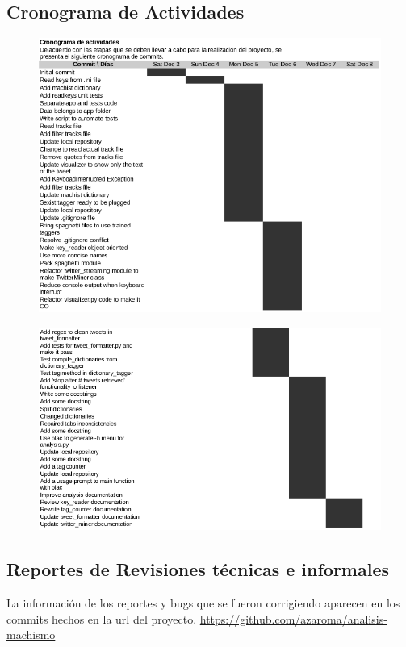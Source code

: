 \documentclass[oneside]{book}
\begin{document}
\subsection{Cronograma de Actividades}
\begin{figure}[H]
\includegraphics[scale=0.5]{crono1.png}
\end{figure}
\begin{figure}[H]
\includegraphics[scale=0.5]{crono2.png}
\end{figure}
\subsection{Reportes de Revisiones técnicas e informales}
La información de los reportes y bugs que se fueron corrigiendo aparecen en los commits hechos en la url del proyecto.
\url{https://github.com/azaroma/analisis-machismo}
\end{document}
